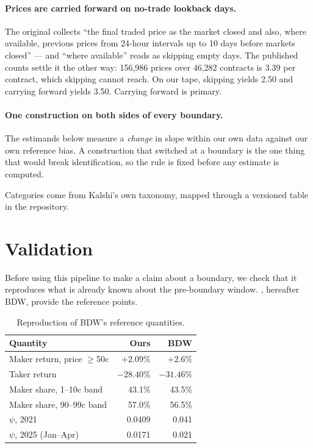 \documentclass[preprint,12pt,authoryear]{elsarticle}
\begin{document}
\paragraph{Prices are carried forward on no-trade lookback days.} The original
collects ``the final traded price as the market closed and also, where
available, previous prices from 24-hour intervals up to 10 days before markets
closed'' --- and ``where available'' reads as skipping empty days. The published
counts settle it the other way: 156,986 prices over 46,282 contracts
is 3.39 per contract, which skipping cannot reach. On our tape, skipping yields
2.50 and carrying forward yields 3.50. Carrying forward is primary.

\paragraph{One construction on both sides of every boundary.} The estimands
below measure a \emph{change} in slope within our own data against our own
reference bias. A construction that switched at a boundary is the one thing that
would break identification, so the rule is fixed before any estimate is
computed.

Categories come from Kalshi's own taxonomy, mapped through a versioned table in
the repository.

\section{Validation}\label{sec:validation}

Before using this pipeline to make a claim about a boundary, we check that it
reproduces what is already known about the pre-boundary window.
\citet{burgi2026}, hereafter BDW, provide the reference points.

\begin{table}[htbp]
\centering
\caption{Reproduction of BDW's reference quantities.}
\begin{tabular}{lrr}
\toprule
Quantity & Ours & BDW \\
\midrule
Maker return, price $\geq$50c & $+2.09\%$ & $+2.6\%$ \\
Taker return                  & $-28.40\%$ & $-31.46\%$ \\
Maker share, 1--10c band      & 43.1\% & 43.5\% \\
Maker share, 90--99c band     & 57.0\% & 56.5\% \\
$\psi$, 2021                  & 0.0409 & 0.041 \\
$\psi$, 2025 (Jan--Apr)       & 0.0171 & 0.021 \\
\bottomrule
\end{tabular}
\end{table}
\end{document}

